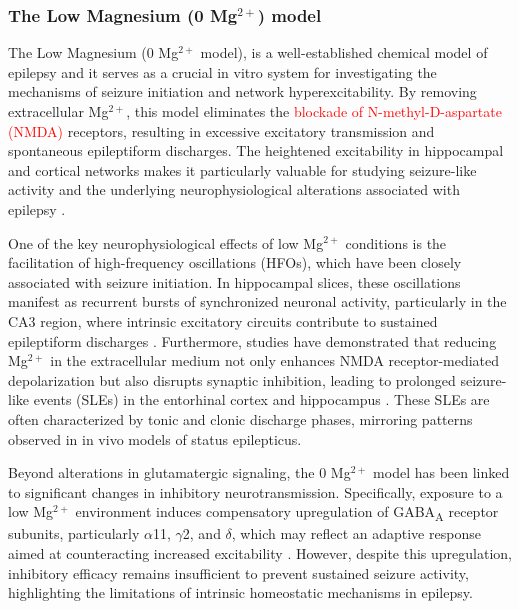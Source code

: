\documentclass{article}
\begin{document}
\subsubsection{The Low Magnesium (0 \texorpdfstring{Mg$^{2+}$}{Mg2+}) model}

The Low Magnesium (0 Mg$^{2+}$ model), is a well-established chemical model of epilepsy and it serves as a crucial in vitro system for investigating the mechanisms of seizure initiation and network hyperexcitability. By removing extracellular Mg$^{2+}$, this model eliminates the \textcolor{red}{blockade of N-methyl-D-aspartate (NMDA)} receptors, resulting in excessive excitatory transmission and spontaneous epileptiform discharges. The heightened excitability in hippocampal and cortical networks makes it particularly valuable for studying seizure-like activity and the underlying neurophysiological alterations associated with epilepsy \cite{lasztoczi2004, zalay2010}.

One of the key neurophysiological effects of low Mg$^{2+}$ conditions is the facilitation of high-frequency oscillations (HFOs), which have been closely associated with seizure initiation. In hippocampal slices, these oscillations manifest as recurrent bursts of synchronized neuronal activity, particularly in the CA3 region, where intrinsic excitatory circuits contribute to sustained epileptiform discharges \cite{lasztoczi2004}. Furthermore, studies have demonstrated that reducing Mg$^{2+}$ in the extracellular medium not only enhances NMDA receptor-mediated depolarization but also disrupts synaptic inhibition, leading to prolonged seizure-like events (SLEs) in the entorhinal cortex and hippocampus \cite{zalay2010}. These SLEs are often characterized by tonic and clonic discharge phases, mirroring patterns observed in in vivo models of status epilepticus.

Beyond alterations in glutamatergic signaling, the 0 Mg$^{2+}$ model has been linked to significant changes in inhibitory neurotransmission. Specifically, exposure to a low Mg$^{2+}$ environment induces compensatory upregulation of GABA\textsubscript{A} receptor subunits, particularly $\alpha$11, $\gamma$2, and $\delta$, which may reflect an adaptive response aimed at counteracting increased excitability \cite{yu2017}. However, despite this upregulation, inhibitory efficacy remains insufficient to prevent sustained seizure activity, highlighting the limitations of intrinsic homeostatic mechanisms in epilepsy.
\end{document}
